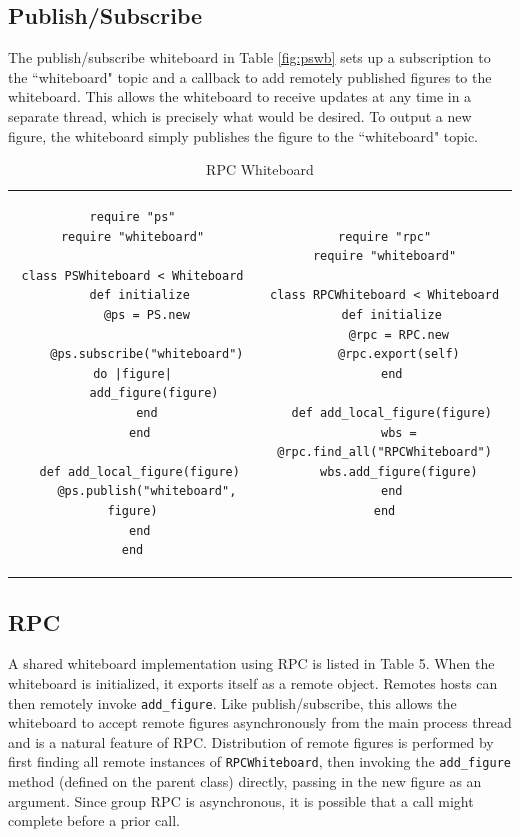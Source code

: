 \documentclass{llncs}
\begin{document}
\subsection{Publish/Subscribe}

The publish/subscribe whiteboard in Table \ref{fig:pswb} sets up a subscription to the ``whiteboard" topic and a callback to add remotely published figures to the whiteboard. This allows the whiteboard to receive updates at any time in a separate thread, which is precisely what would be desired. To output a new figure, the whiteboard simply publishes the figure to the ``whiteboard" topic.

\begin{table}
\centering
\begin{tabular}{c c}
\begin{minipage}{2.75in}
\caption{Publish/Subscribe Whiteboard}\label{fig:pswb}
\begin{verbatim}
require "ps"
require "whiteboard"

class PSWhiteboard < Whiteboard
  def initialize
    @ps = PS.new
    
    @ps.subscribe("whiteboard") do |figure|
      add_figure(figure)
    end
  end

  def add_local_figure(figure)
    @ps.publish("whiteboard", figure)
  end
end
\end{verbatim}
\end{minipage}
&
\begin{minipage}{2.5in}
\caption{RPC Whiteboard}\label{fig:rpcwb}
\begin{verbatim}
require "rpc"
require "whiteboard"

class RPCWhiteboard < Whiteboard
  def initialize
    @rpc = RPC.new
    @rpc.export(self)
  end

  def add_local_figure(figure)
    wbs = @rpc.find_all("RPCWhiteboard")
    wbs.add_figure(figure)
  end
end


\end{verbatim}
\end{minipage}
\end{tabular}
\end{table}


\subsection{RPC}

A shared whiteboard implementation using RPC is listed in Table 5. When the whiteboard is initialized, it exports itself as a remote object. Remotes hosts can then remotely invoke \texttt{add\_figure}. Like publish/subscribe, this allows the whiteboard to accept remote figures asynchronously from the main process thread and is a natural feature of RPC. Distribution of remote figures is performed by first finding all remote instances of \texttt{RPCWhiteboard}, then invoking the \texttt{add\_figure} method (defined on the parent class) directly, passing in the new figure as an argument. Since group RPC is asynchronous, it is possible that a call might complete before a prior call.
\end{document}
